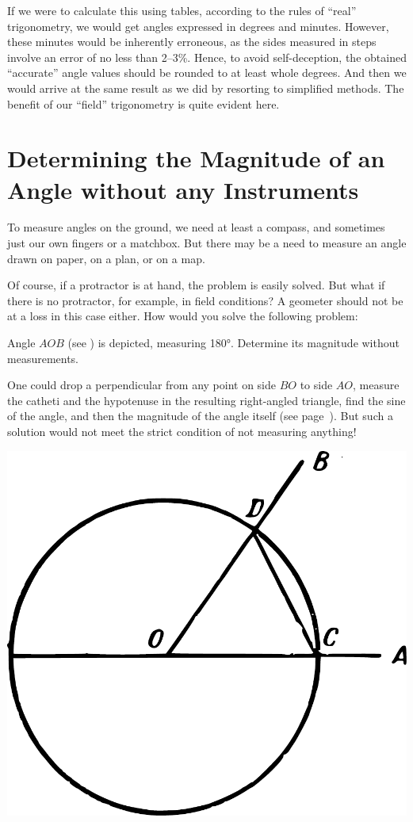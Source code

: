 If we were to calculate this using tables, according to the rules of ``real'' trigonometry, we would get angles expressed in degrees and minutes. However, these minutes would be inherently erroneous, as the sides measured in steps involve an error of no less than 2–3\%. Hence, to avoid self-deception, the obtained ``accurate'' angle values should be rounded to at least whole degrees. And then we would arrive at the same result as we did by resorting to simplified methods. The benefit of our ``field'' trigonometry is quite evident here.


\section{Determining the Magnitude of an Angle without any Instruments}

To measure angles on the ground, we need at least a compass, and sometimes just our own fingers or a matchbox. But there may be a need to measure an angle drawn on paper, on a plan, or on a map.

Of course, if a protractor is at hand, the problem is easily solved. But what if there is no protractor, for example, in field conditions? A geometer should not be at a loss in this case either. How would you solve the following problem: 

\ques Angle $AOB$ (see ) is depicted, measuring \ang{180}. Determine its magnitude without measurements.

\ans One could drop a perpendicular from any point on side $BO$ to side $AO$, measure the catheti and the hypotenuse in the resulting right-angled triangle, find the sine of the angle, and then the magnitude of the angle itself (see page~\pageref{sec-5.3}). But such a solution would not meet the strict condition of not measuring anything!
\begin{marginfigure}%
\centering
\includegraphics[width=\textwidth]{figures/ch-05/fig-097.pdf}
\end{marginfigure}

